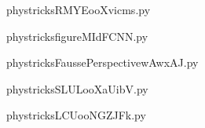     

    \clearpage
    


    \newcommand{\CaptionFigRMYEooXvicms}{<+Type your caption here+>}
    \begin{center}
        
    \end{center}
    phystricksRMYEooXvicms.py

    

    \clearpage
    


    \newcommand{\CaptionFigfigureMIdFCNN}{<+Type your caption here+>}
    \begin{center}
        
    \end{center}
    phystricksfigureMIdFCNN.py

    

    \clearpage
    


    \newcommand{\CaptionFigFaussePerspectivewAwxAJ}{<+Type your caption here+>}
    \begin{center}
        
    \end{center}
    phystricksFaussePerspectivewAwxAJ.py

    

    \clearpage
    


    \newcommand{\CaptionFigSLULooXaUibV}{<+Type your caption here+>}
    \begin{center}
        
    \end{center}
    phystricksSLULooXaUibV.py

    

    \clearpage
    


    \newcommand{\CaptionFigLCUooNGZJFk}{<+Type your caption here+>}
    \begin{center}
        
    \end{center}
    phystricksLCUooNGZJFk.py

    

    \clearpage
    

